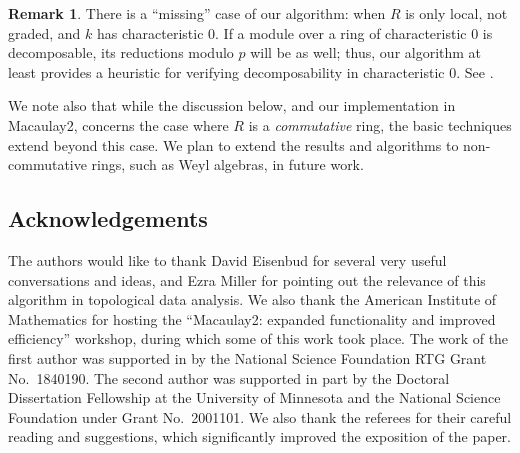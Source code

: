 \documentclass[12pt]{article}
\theoremstyle{theorem}
\numberwithin{thm}{section}
\theoremstyle{definition}
\newtheorem{rem}[thm]{Remark}
\begin{document}
\begin{rem}
  There is a ``missing'' case of our algorithm: when $R$ is only local, not graded, and $k$ has characteristic 0.
  If a module over a ring of characteristic 0 is decomposable, its reductions modulo $p$ will be as well; thus, our algorithm at least provides a heuristic for verifying decomposability in characteristic 0. See .

  We note also that while the discussion below, and our implementation in Macaulay2, concerns the case where $R$ is a \emph{commutative} ring, the basic techniques extend beyond this case. We plan to extend the results and algorithms to non-commutative rings, such as Weyl algebras, in future work.
\end{rem}



\subsection*{Acknowledgements}
The authors would like to thank David Eisenbud for several very useful conversations and ideas, and Ezra Miller for pointing out the relevance of this algorithm in topological data analysis.
We also thank the American Institute of Mathematics for hosting the ``Macaulay2: expanded functionality and improved efficiency'' workshop, during which some of this work took place.
The work of the first author was supported in by the National Science Foundation RTG Grant No.~1840190.
The second author was supported in part by the Doctoral Dissertation Fellowship at the University of Minnesota and the National Science Foundation under Grant No.~2001101.
We also thank the referees for their careful reading and suggestions, which significantly improved the exposition of the paper.
\end{document}
